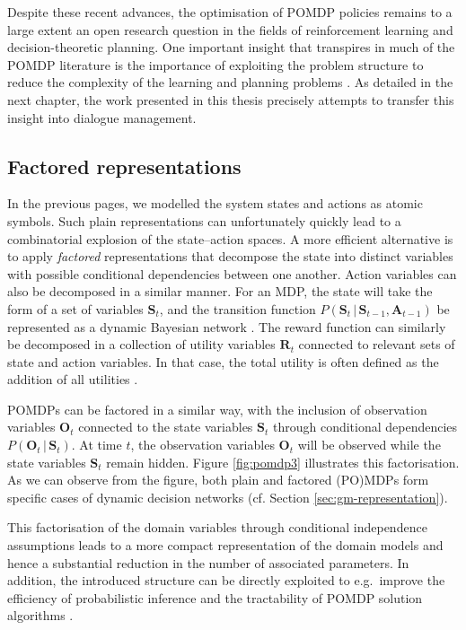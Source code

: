 Despite these recent advances, the optimisation of POMDP policies remains to a large extent an open research question in the fields of reinforcement learning and decision-theoretic planning. One important insight that transpires in much of the POMDP literature is the importance of exploiting the problem structure to reduce the complexity of the learning and planning problems \citep{Pineau:2004,poupart2005}.  As detailed in the next chapter, the work presented in this thesis precisely attempts to transfer this insight into dialogue management. 

\subsection{Factored representations}
\label{sec:factored}
In the previous pages, we modelled the system states and actions as atomic symbols.  Such plain representations can unfortunately quickly lead to a combinatorial explosion of the state--action spaces. A more efficient alternative is to apply \textit{factored} representations that decompose the state into distinct variables with possible conditional dependencies between one another.  Action variables can also be decomposed in a similar manner.  For an MDP, the state will take the form of a set of variables $\mathbf{S}_t$, and the transition function $P(\mathbf{S}_t \, | \, \mathbf{S}_{t-1},\mathbf{A}_{t-1})$ be represented as a dynamic Bayesian network \citep{boutilier1999}. The reward function can similarly be decomposed in a collection of utility variables $\mathbf{R}_t$ connected to relevant sets of state and action variables. In that case, the total utility is often defined as the addition of all utilities \citep{Bacchus:1995}.

POMDPs can be factored in a similar way, with the inclusion of observation variables $\mathbf{O}_t$ connected to the state variables $\mathbf{S}_t$ through conditional dependencies $P(\mathbf{O}_t \, | \, \mathbf{S}_t)$.  At time $t$, the observation variables $\mathbf{O}_t$ will be observed while the state variables  $\mathbf{S}_t$ remain hidden. 
Figure \ref{fig:pomdp3} illustrates this factorisation. As we can observe from the figure, both plain and factored (PO)MDPs form specific cases of dynamic decision networks (cf. Section \ref{sec:gm-representation}). 

This factorisation of the domain variables through conditional independence assumptions leads to a more compact representation of the domain models and hence a substantial reduction in the number of associated parameters.  In addition, the introduced structure can be directly exploited to e.g.\ improve the efficiency of probabilistic inference \citep{Koller+Friedman:09} and the tractability of POMDP solution algorithms \citep{poupart2005}.

